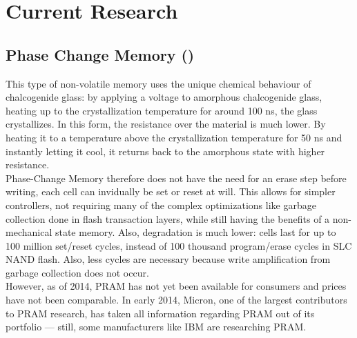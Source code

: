 \documentclass{acm_proc_article-sp}
\begin{document}
\section{Current Research}

\subsection{Phase Change Memory ()}
This type of non-volatile memory uses the unique chemical behaviour of chalcogenide glass: by applying a voltage to amorphous chalcogenide glass, heating up to the crystallization temperature for around 100 ns, the glass crystallizes. In this form, the resistance over the material is much lower. By heating it to a temperature above the crystallization temperature for 50 ns and instantly letting it cool, it returns back to the amorphous state with higher resistance.
\\
Phase-Change Memory therefore does not have the need for an erase step before writing, each cell can invidually be set or reset at will. This allows for simpler controllers, not requiring many of the complex optimizations like garbage collection done in flash transaction layers, while still having the benefits of a non-mechanical state memory. Also, degradation is much lower: cells last for up to 100 million set/reset cycles, instead of 100 thousand program/erase cycles in SLC NAND flash. Also, less cycles are necessary because write amplification from garbage collection does not occur.
\\
However, as of 2014, PRAM has not yet been available for consumers and prices have not been comparable. In early 2014, Micron, one of the largest contributors to PRAM research, has taken all information regarding PRAM out of its portfolio --- still, some manufacturers like IBM are researching PRAM.
\end{document}
